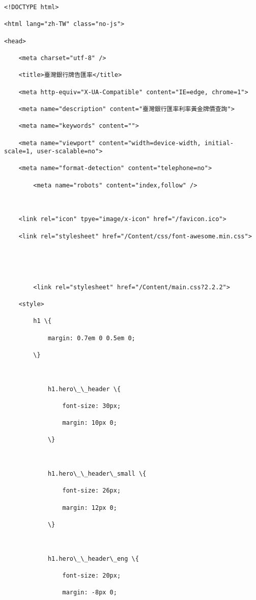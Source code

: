 \documentclass[11pt]{article}
\begin{document}
    \begin{Verbatim}[commandchars=\\\{\}]
<!DOCTYPE html>

<html lang="zh-TW" class="no-js">

<head>

    <meta charset="utf-8" />

    <title>臺灣銀行牌告匯率</title>

    <meta http-equiv="X-UA-Compatible" content="IE=edge, chrome=1">

    <meta name="description" content="臺灣銀行匯率利率黃金牌價查詢">

    <meta name="keywords" content="">

    <meta name="viewport" content="width=device-width, initial-scale=1, user-scalable=no">

    <meta name="format-detection" content="telephone=no">

        <meta name="robots" content="index,follow" />



    <link rel="icon" tpye="image/x-icon" href="/favicon.ico">

    <link rel="stylesheet" href="/Content/css/font-awesome.min.css">





        <link rel="stylesheet" href="/Content/main.css?2.2.2">

    <style>

        h1 \{

            margin: 0.7em 0 0.5em 0;

        \}



            h1.hero\_\_header \{

                font-size: 30px;

                margin: 10px 0;

            \}



            h1.hero\_\_header\_small \{

                font-size: 26px;

                margin: 12px 0;

            \}



            h1.hero\_\_header\_eng \{

                font-size: 20px;

                margin: -8px 0;


\end{Verbatim}
\end{document}
